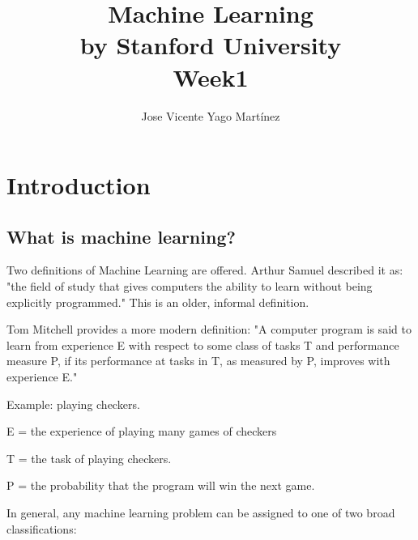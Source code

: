\documentclass[12pt, A4,onecolumn]{article} %
\title{\textbf{Machine Learning\\ 
\small{by Stanford University}\\
Week1
}}
\author{
Jose Vicente Yago Martínez
}%
\begin{document}
\maketitle

	





\newpage
\tableofcontents

\newpage

\section{Introduction}
\subsection{What is machine learning?}
Two definitions of Machine Learning are offered. Arthur Samuel described it as: "the field of study that gives computers the ability to learn without being explicitly programmed." This is an older, informal definition.

Tom Mitchell provides a more modern definition: "A computer program is said to learn from experience E with respect to some class of tasks T and performance measure P, if its performance at tasks in T, as measured by P, improves with experience E."



Example: playing checkers.

E = the experience of playing many games of checkers

T = the task of playing checkers.

P = the probability that the program will win the next game.

In general, any machine learning problem can be assigned to one of two broad classifications:
\end{document}
